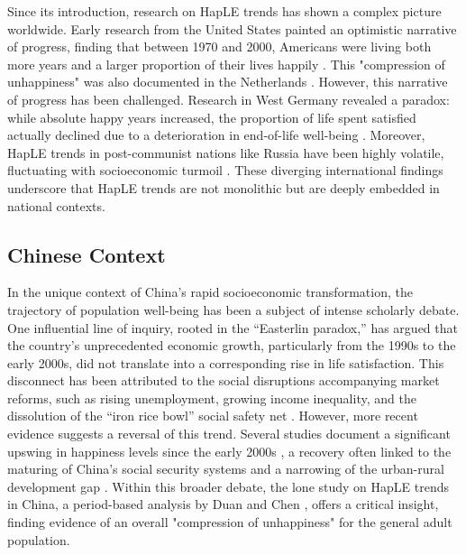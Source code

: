 \documentclass[12pt, a4paper]{article}
\begin{document}
Since its introduction, research on HapLE trends has shown a complex picture worldwide. Early research from the United States painted an optimistic narrative of progress, finding that between 1970 and 2000, Americans were living both more years and a larger proportion of their lives happily \autocite{yang.2008.long,yang.2010.increment}. This "compression of unhappiness" was also documented in the Netherlands \autocite{perenboom.2004.trends}. However, this narrative of progress has been challenged. Research in West Germany revealed a paradox: while absolute happy years increased, the proportion of life spent satisfied actually declined due to a deterioration in end-of-life well-being \autocite{nemitz.2022.increasing}. Moreover, HapLE trends in post-communist nations like Russia have been highly volatile, fluctuating with socioeconomic turmoil \autocite{minagawa.2022.trends}. These diverging international findings underscore that HapLE trends are not monolithic but are deeply embedded in national contexts.

\subsection{Chinese Context}

In the unique context of China's rapid socioeconomic transformation, the trajectory of population well-being has been a subject of intense scholarly debate. One influential line of inquiry, rooted in the “Easterlin paradox,” has argued that the country's unprecedented economic growth, particularly from the 1990s to the early 2000s, did not translate into a corresponding rise in life satisfaction\autocite{easterlin.2012.chinas,graham.2017.happiness,knight.2011.does}. This disconnect has been attributed to the social disruptions accompanying market reforms, such as rising unemployment, growing income inequality, and the dissolution of the “iron rice bowl” social safety net \autocite{easterlin.2012.chinas,li.2014.time}. However, more recent evidence suggests a reversal of this trend. Several studies document a significant upswing in happiness levels since the early 2000s \autocite{cai.2023.does,wang.2023.hierarchical}, a recovery often linked to the maturing of China's social security systems and a narrowing of the urban-rural development gap \autocite{payne.2022.expansion}. Within this broader debate, the lone study on HapLE trends in China, a period-based analysis by Duan and Chen \autocite{duan.2020.happy}, offers a critical insight, finding evidence of an overall "compression of unhappiness" for the general adult population.
\end{document}
